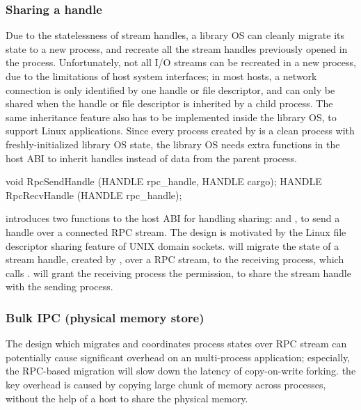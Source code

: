 \subsubsection*{Sharing a handle}




Due to the statelessness of stream handles,
a library OS can cleanly migrate its state to a new process, and recreate all the stream handles previously opened in the process.
Unfortunately, not all I/O streams can be recreated
in a new process, due to the limitations of host system interfaces;
in most hosts, a network connection is only identified by one handle or file descriptor,
and can only be shared when the handle or file descriptor
is inherited by a child process.
The same inheritance feature also has to be implemented
inside the library OS, to support Linux applications.
Since every process created by  is a clean \graphene{} process with freshly-initialized library OS state,
the library OS needs extra functions in the host ABI
to inherit handles instead of data from the parent process.


\begin{paldef}
void   RpcSendHandle (HANDLE rpc_handle, HANDLE cargo);
HANDLE RpcRecvHandle (HANDLE rpc_handle);
\end{paldef}



\graphene{} introduces two functions to the host ABI for handling sharing:  and , to send a handle over a connected RPC stream.
The design is motivated by the Linux file descriptor sharing feature of UNIX domain sockets.
 will migrate the state of a stream handle, created by ,
over a RPC stream, to the receiving process, which calls .
 will grant the receiving process the permission, to share the stream handle with the sending process.


\subsubsection*{Bulk IPC (physical memory store)}


The \graphene{} design which migrates and coordinates process states over RPC stream
can potentially cause significant overhead on an multi-process application;
especially, the RPC-based migration will slow down the latency of copy-on-write forking.
the key overhead
is caused by copying large chunk of memory
across processes, without the help of a host to share the physical memory.

